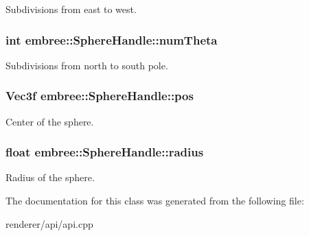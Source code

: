 Subdivisions from east to west. 

\hypertarget{classembree_1_1_sphere_handle_a390f2744a81ad1a6dcce91d46c7d285b}{
\subsubsection[{numTheta}]{\setlength{\rightskip}{0pt plus 5cm}int {\bf embree::SphereHandle::numTheta}}}
\label{classembree_1_1_sphere_handle_a390f2744a81ad1a6dcce91d46c7d285b}


Subdivisions from north to south pole. 

\hypertarget{classembree_1_1_sphere_handle_a5517706468c65621fed3fe75a5c1e435}{
\subsubsection[{pos}]{\setlength{\rightskip}{0pt plus 5cm}Vec3f {\bf embree::SphereHandle::pos}}}
\label{classembree_1_1_sphere_handle_a5517706468c65621fed3fe75a5c1e435}


Center of the sphere. 

\hypertarget{classembree_1_1_sphere_handle_a84283a6dcc7412631db5f563ee2e7af0}{
\subsubsection[{radius}]{\setlength{\rightskip}{0pt plus 5cm}float {\bf embree::SphereHandle::radius}}}
\label{classembree_1_1_sphere_handle_a84283a6dcc7412631db5f563ee2e7af0}


Radius of the sphere. 



The documentation for this class was generated from the following file:\begin{DoxyCompactItemize}
\item 
renderer/api/api.cpp\end{DoxyCompactItemize}
